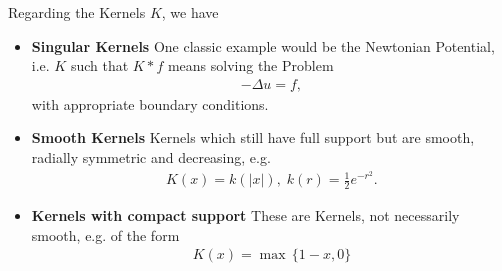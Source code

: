 \documentclass[11pt,a4paper]{article}
\theoremstyle{definition}
\numberwithin{equation}{section}
\begin{document}
Regarding the Kernels $K$, we have
\begin{itemize}
\item\textbf{Singular Kernels} One classic example would be the Newtonian Potential, i.e. $K$ such that $K\ast f$ means solving the Problem
\begin{align*}
 -\Delta u = f,
\end{align*}
with appropriate boundary conditions.
\item\textbf{Smooth Kernels} Kernels which still have full support but are smooth, radially symmetric and decreasing, e.g.
\begin{align*}
 K(x) = k(|x|),\; k(r) = \frac{1}{2}e^{-r^2}.
\end{align*}
\item\textbf{Kernels with compact support} These are Kernels, not necessarily smooth, e.g. of the form
\begin{align*}
 K(x) = \max\, \{ 1-x, 0\}
\end{align*}
\end{itemize}
\end{document}
